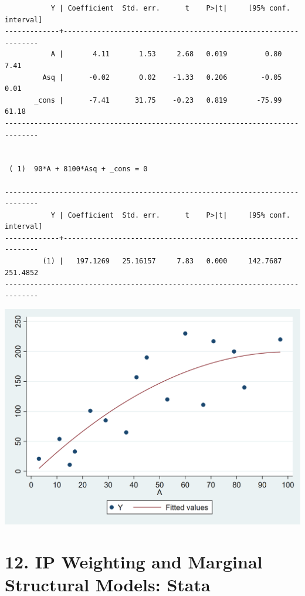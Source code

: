 \documentclass[
  10pt,
  a4paper,
]{book}
\begin{document}
\begin{verbatim}
           Y | Coefficient  Std. err.      t    P>|t|     [95% conf. interval]
-------------+----------------------------------------------------------------
           A |       4.11       1.53     2.68   0.019         0.80        7.41
         Asq |      -0.02       0.02    -1.33   0.206        -0.05        0.01
       _cons |      -7.41      31.75    -0.23   0.819       -75.99       61.18
------------------------------------------------------------------------------


 ( 1)  90*A + 8100*Asq + _cons = 0

------------------------------------------------------------------------------
           Y | Coefficient  Std. err.      t    P>|t|     [95% conf. interval]
-------------+----------------------------------------------------------------
         (1) |   197.1269   25.16157     7.83   0.000     142.7687    251.4852
------------------------------------------------------------------------------
\end{verbatim}

\begin{center}\includegraphics[width=0.85\linewidth]{figs/stata-fig-11-5} \end{center}

\hypertarget{ip-weighting-and-marginal-structural-models-stata}{%
\chapter*{12. IP Weighting and Marginal Structural Models: Stata}\label{ip-weighting-and-marginal-structural-models-stata}}
\end{document}
